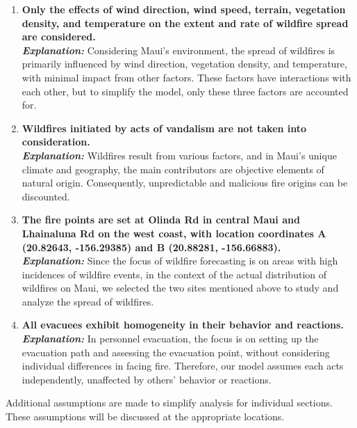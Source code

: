 \documentclass[12pt]{article}  %
\begin{document}
\begin{enumerate}
	\item \textbf{Only the effects of wind direction, wind speed, terrain, vegetation density, and temperature on the extent and rate of wildfire spread are considered.}\\
	\textbf{\textit{Explanation:}} Considering Maui's environment, the spread of wildfires is primarily influenced by wind direction, vegetation density, and temperature, with minimal impact from other factors. These factors have interactions with each other, but to simplify the model, only these three factors are accounted for.
	\item \textbf{Wildfires initiated by acts of vandalism are not taken into consideration.}\\
	\textbf{\textit{Explanation:}} Wildfires result from various factors, and in Maui's unique climate and geography, the main contributors are objective elements of natural origin. Consequently, unpredictable and malicious fire origins can be discounted.
	\item \textbf{The fire points are set at Olinda Rd in central Maui and Lhainaluna Rd on the west coast, with location coordinates A (20.82643, -156.29385) and B (20.88281, -156.66883).}\\
	\textbf{\textit{Explanation:}} Since the focus of wildfire forecasting is on areas with high incidences of wildfire events, in the context of the actual distribution of wildfires on Maui, we selected the two sites mentioned above to study and analyze the spread of wildfires.
	\item \textbf{All evacuees exhibit homogeneity in their behavior and reactions.}\\
	\textbf{\textit{Explanation:}} In personnel evacuation, the focus is on setting up the evacuation path and assessing the evacuation point, without considering individual differences in facing fire. Therefore, our model assumes each acts independently, unaffected by others' behavior or reactions.
	
\end{enumerate}

Additional assumptions are made to simplify analysis for individual sections. These assumptions will be discussed at the appropriate locations.
\end{document}
